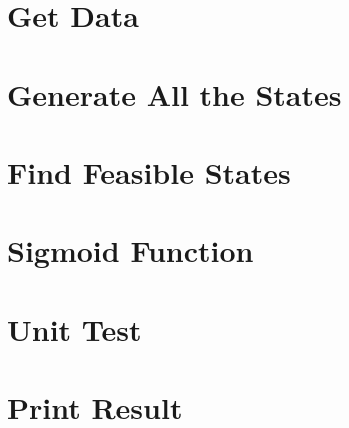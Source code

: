 \documentclass[a4paper, 12pt, notitlepage]{report}
\begin{document}
\section{Get Data}

\section{Generate All the States}

\section{Find Feasible States}

\section{Sigmoid Function}

\section{Unit Test}

\section{Print Result}




\end{document}

